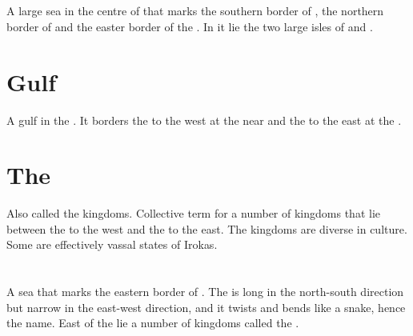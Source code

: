 \section{\Risvaelsea}
\index{\Risvaelsea}
A large sea in the centre of  that marks the southern border of , the northern border of  and the easter border of the . In it lie the two large isles of  and . 















\section{\Samure{} Gulf}
A gulf in the . It borders the  to the west at the  near  and the  to the east at the . 















\section{The \Serplands}
\index{\Serplands}
Also called the \Serpadj{} kingdoms. Collective term for a number of kingdoms that lie between the  to the west and the \Dragonridge{} to the east. The \Serpadj{} kingdoms are diverse in culture. Some are effectively vassal states of Irokas. 















\section{\Serpsea}
\index{\Serpsea}
A sea that marks the eastern border of . The \Serp{} is long in the north-south direction but narrow in the east-west direction, and it twists and bends like a snake, hence the name. East of the \Serp{} lie a number of kingdoms called the . 
\also{\Serplands}

